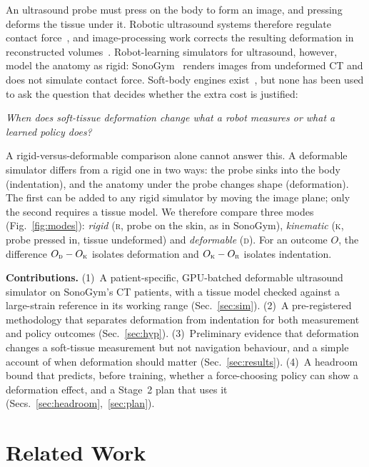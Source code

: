 \documentclass[conference]{IEEEtran}
\newcommand{\RM}{\textsc{r}}   %
\newcommand{\KM}{\textsc{k}}   %
\newcommand{\DM}{\textsc{d}}   %
\begin{document}
An ultrasound probe must press on the body to form an image, and pressing deforms the tissue under it. Robotic
ultrasound systems therefore regulate contact force~\cite{jiang2023review}, and image-processing work corrects the
resulting deformation in reconstructed volumes~\cite{burcher2001deformation,jiang2021deformation}. Robot-learning
simulators for ultrasound, however, model the anatomy as rigid: SonoGym~\cite{ao2025sonogym} renders images from
undeformed CT and does not simulate contact force. Soft-body engines exist~\cite{ou2026cressimneo,todorov2012mujoco},
but none has been used to ask the question that decides whether the extra cost is justified:

\smallskip
\noindent\emph{When does soft-tissue deformation change what a robot measures or what a learned policy does?}
\smallskip

A rigid-versus-deformable comparison alone cannot answer this. A deformable simulator differs from a rigid one in two
ways: the probe sinks into the body (indentation), and the anatomy under the probe changes shape (deformation).
The first can be added to any rigid simulator by moving the image plane; only the second requires a tissue model.
We therefore compare three modes (Fig.~\ref{fig:modes}): \emph{rigid} (\RM, probe on the skin, as in
SonoGym), \emph{kinematic} (\KM, probe pressed in, tissue undeformed) and \emph{deformable} (\DM). For an outcome
$O$, the difference $O_\DM - O_\KM$ isolates deformation and $O_\KM - O_\RM$ isolates indentation.

\textbf{Contributions.}
(1)~A patient-specific, GPU-batched deformable ultrasound simulator on SonoGym's CT patients, with a tissue model
checked against a large-strain reference in its working range (Sec.~\ref{sec:sim}).
(2)~A pre-registered methodology that separates deformation from indentation for both measurement and policy
outcomes (Sec.~\ref{sec:hyp}).
(3)~Preliminary evidence that deformation changes a soft-tissue measurement but not navigation behaviour, and a
simple account of when deformation should matter (Sec.~\ref{sec:results}).
(4)~A headroom bound that predicts, before training, whether a force-choosing policy can show a deformation effect,
and a Stage~2 plan that uses it (Secs.~\ref{sec:headroom},~\ref{sec:plan}).

\section{Related Work}
\end{document}
